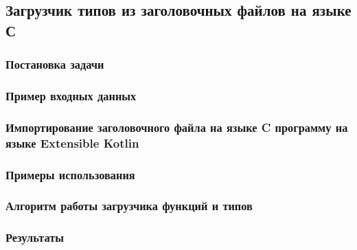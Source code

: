 \subsection{Загрузчик типов из заголовочных файлов на языке С}
\subsubsection{Постановка задачи}
\subsubsection{Пример входных данных}
\subsubsection{Импортирование заголовочного файла на языке C программу на языке Extensible Kotlin}
\subsubsection{Примеры использования}
\subsubsection{Алгоритм работы загрузчика функций и типов}
\subsubsection{Результаты}